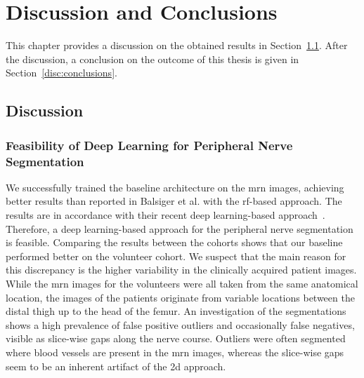 \chapter{Discussion and Conclusions} \label{chap:discussion_and_conclusions}
This chapter provides a discussion on the obtained results in Section~\ref{disc:discussion}. After the discussion, a conclusion on the outcome of this thesis is given in Section~\ref{disc:conclusions}.

\section{Discussion} \label{disc:discussion}
\subsection{Feasibility of Deep Learning for Peripheral Nerve Segmentation}
We successfully trained the baseline architecture on the \gls{mrn} images, achieving better results than reported in Balsiger et al. \cite{Balsiger2016DevelopmentApproaches} with the \gls{rf}-based approach. The results are in accordance with their recent deep learning-based approach~\cite{Balsiger2018SegmentationApproach}. Therefore, a deep learning-based approach for the peripheral nerve segmentation is feasible.
Comparing the results between the cohorts shows that our baseline performed better on the volunteer cohort. We suspect that the main reason for this discrepancy is the higher variability in the clinically acquired patient images. While the \gls{mrn} images for the volunteers were all taken from the same anatomical location, the images of the patients originate from variable locations between the distal thigh up to the head of the femur. An investigation of the segmentations shows a high prevalence of false positive outliers and occasionally false negatives, visible as slice-wise gaps along the nerve course. Outliers were often segmented where blood vessels are present in the \gls{mrn} images, whereas the slice-wise gaps seem to be an inherent artifact of the \gls{2d} approach.\\
